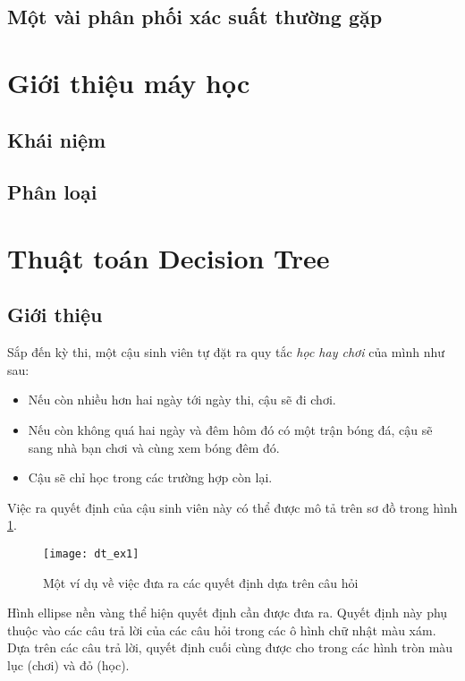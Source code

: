 \documentclass[../main-report.tex]{subfiles}
\begin{document}
\subsection{Một vài phân phối xác suất thường gặp}

\section{Giới thiệu máy học}
\subsection{Khái niệm}

\subsection{Phân loại}

\section{Thuật toán Decision Tree}
\subsection{Giới thiệu}
Sắp đến kỳ thi, một cậu sinh viên tự đặt ra quy tắc \textit{học hay chơi} của mình như sau:

\begin{itemize}
\item Nếu còn nhiều hơn hai ngày tới ngày thi, cậu sẽ đi chơi.
\item Nếu còn không quá hai ngày và đêm hôm đó có một trận bóng đá, cậu sẽ sang nhà bạn chơi và cùng xem bóng đêm đó.
\item Cậu sẽ chỉ học trong các trường hợp còn lại.
\end{itemize}

Việc ra quyết định của cậu sinh viên này có thể được mô tả trên sơ đồ trong hình \ref{fig:dt_ex1}.

\begin{figure}[ht!]
\centering\texttt{[image: dt\_ex1]}
\caption{Một ví dụ về việc đưa ra các quyết định dựa trên câu hỏi}
\label{fig:dt_ex1}
\end{figure}

Hình ellipse nền vàng thể hiện quyết định cần được đưa ra. Quyết định này phụ thuộc vào các câu trả lời của các câu hỏi trong các ô hình chữ nhật màu xám. Dựa trên các câu trả lời, quyết định cuối cùng được cho trong các hình tròn màu lục (chơi) và đỏ (học).
\end{document}
